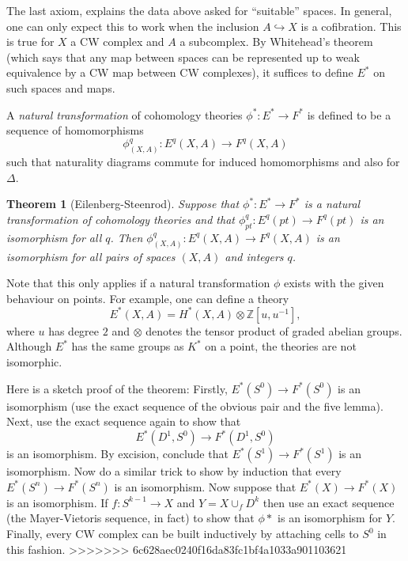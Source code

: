 \documentclass[a4paper,10pt]{article}
\theoremstyle{plain}%
\newtheorem{thm}{Theorem}
\theoremstyle{definition}
\theoremstyle{remark}
\newcommand{\ZZ}{\mathbb{Z}}
\newcommand{\into}{\hookrightarrow}
\begin{document}
The last axiom, explains the data above asked for ``suitable''
spaces. In general, one can only expect this to work when the
inclusion $A \into X$ is a cofibration. This is true for $X$ a CW
complex and $A$ a subcomplex. By Whitehead's theorem (which says that
any map between spaces can be represented up to weak equivalence by a
CW map between CW complexes), it suffices to define $E^*$ on such
spaces and maps.

A \emph{natural transformation} of cohomology theories $\phi^*: E^*
\to F^*$ is defined to be a sequence of homomorphisms
\begin{equation*}
  \phi^q_{(X,A)}: E^q(X,A) \to F^q(X,A)
\end{equation*}
such that naturality diagrams commute for induced homomorphisms and
also for $\Delta$.

\begin{thm}[Eilenberg-Steenrod]
  Suppose that $\phi^*: E^*\to F^*$ is a natural transformation of
  cohomology theories and that $\phi^q_{pt}: E^q(pt)\to F^q(pt)$ is an
  isomorphism for all $q$. Then $\phi^q_{(X,A)}: E^q(X,A)\to F^q(X,A)$
  is an isomorphism for all pairs of spaces $(X,A)$ and integers $q$.
\end{thm}

Note that this only applies if a natural transformation $\phi$ exists
with the given behaviour on points. For example, one can define a
theory
\begin{equation*}
  E^*(X,A) = H^*(X,A)\otimes \ZZ[u,u^{-1}],
\end{equation*}
where $u$ has degree $2$ and $\otimes$ denotes the tensor product of
graded abelian groups. Although $E^*$ has the same groups as $K^*$ on
a point, the theories are not isomorphic.

Here is a sketch proof of the theorem: Firstly, $E^*(S^0)\to F^*(S^0)$
is an isomorphism (use the exact sequence of the obvious pair and the
five lemma). Next, use the exact sequence again to show that
\begin{equation*}
  E^*(D^1,S^0) \to F^*(D^1,S^0)
\end{equation*}
is an isomorphism. By excision, conclude that $E^*(S^1)\to F^*(S^1)$
is an isomorphism. Now do a similar trick to show by induction that
every $E^*(S^n)\to F^*(S^n)$ is an isomorphism. Now suppose that
$E^*(X)\to F^*(X)$ is an isomorphism. If $f: S^{k-1}\to X$ and
$Y=X\cup_f D^k$ then use an exact sequence (the Mayer-Vietoris
sequence, in fact) to show that $\phi*$ is an isomorphism for
$Y$. Finally, every CW complex can be built inductively by attaching
cells to $S^0$ in this fashion.
>>>>>>> 6c628aec0240f16da83fc1bf4a1033a901103621
\end{document}

